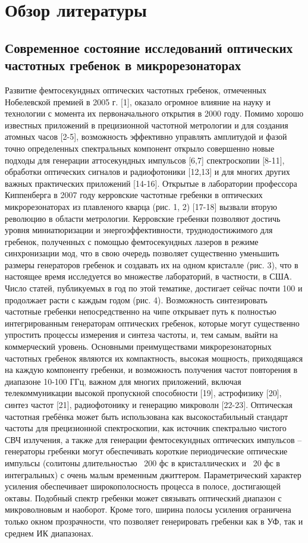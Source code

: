 \chapter{Обзор литературы} \label{chapt1}

\section{Современное состояние исследований оптических частотных гребенок в микрорезонаторах} \label{sect1_1}

Развитие фемтосекундных оптических частотных гребенок, отмеченных Нобелевской премией в 2005 г. [1], оказало огромное влияние на науку и технологии с момента их первоначального открытия в 2000 году. Помимо хорошо известных приложений в прецизионной частотной метрологии и для создания атомных часов [2-5], возможность эффективно управлять амплитудой и фазой точно определенных спектральных компонент открыло совершенно новые подходы для генерации аттосекундных импульсов [6,7] спектроскопии [8-11], обработки оптических сигналов и радиофотоники [12,13] и для многих других важных практических приложений [14-16]. Открытые в лаборатории профессора Киппенберга в 2007 году керровские частотные гребенки в оптических микрорезонаторах из плавленого кварца (рис. 1, 2) [17-18] вызвали вторую революцию в области метрологии. Керровские гребенки позволяют достичь уровня миниатюризации и энергоэффективности, труднодостижимого для гребенок, полученных с помощью фемтосекундных лазеров в режиме синхронизации мод, что в свою очередь позволяет существенно уменьшить размеры генераторов гребенок и создавать их на одном кристалле (рис. 3), что в настоящее время исследуется во множестве лабораторий, в частности, в США. Число статей, публикуемых в год по этой тематике, достигает сейчас почти 100 и продолжает расти с каждым годом (рис. 4).
Возможность синтезировать частотные гребенки непосредственно на чипе открывает путь к полностью интегрированным генераторам оптических гребенок, которые могут существенно упростить процессы измерения и синтеза частоты, и, тем самым, выйти на коммерческий уровень. Основными преимуществами микрорезонаторных частотных гребенок являются их компактность, высокая мощность, приходящаяся на каждую компоненту гребенки, и возможность получения частот повторения в диапазоне 10-100 ГГц, важном для многих приложений, включая телекоммуникации высокой пропускной способности [19], астрофизику [20], синтез частот [21], радиофотонику и генерацию микроволн [22-23]. Оптическая частотная гребёнка может быть использована как высокостабильный стандарт частоты для прецизионной спектроскопии, как источник спектрально чистого СВЧ излучения, а также для генерации фемтосекундных оптических импульсов – генераторы гребенки могут обеспечивать короткие периодические оптические импульсы (солитоны длительностью ~200 фс в кристаллических и ~20 фс в интегральных) с очень малым временным джиттером. Параметрический характер усиления обеспечивает широкополосность процесса в полосе, достигающей октавы. Подобный спектр гребенки может связывать оптический диапазон с микроволновым и наоборот. Кроме того, ширина полосы усиления ограничена только окном прозрачности, что позволяет генерировать гребенки как в УФ, так и среднем ИК диапазонах.
